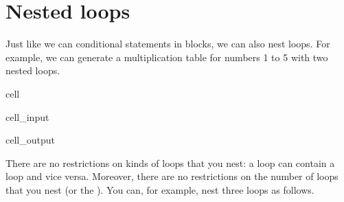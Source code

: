 \documentclass[letterpaper,10pt,english]{jupyterBook}
\begin{document}
\section{Nested loops}
\label{\detokenize{notebooks/03_ControlStructures/03_ControlStructures_student:nested-loops}}
\sphinxAtStartPar
Just like we can  conditional statements in blocks, we can also nest loops. For example, we can generate a multiplication table for numbers 1 to 5 with two nested loops.

\begin{sphinxuseclass}{cell}\begin{sphinxVerbatimInput}

\begin{sphinxuseclass}{cell_input}
\begin{sphinxVerbatim}[commandchars=\\\{\}]
    
      \PYG{p}{[}\PYG{p}{]}
        
\end{sphinxVerbatim}

\end{sphinxuseclass}\end{sphinxVerbatimInput}
\begin{sphinxVerbatimOutput}

\begin{sphinxuseclass}{cell_output}
\begin{sphinxVerbatim}[commandchars=\\\{\}]
[1, 2, 3, 4, 5]
[2, 4, 6, 8, 10]
[3, 6, 9, 12, 15]
[4, 8, 12, 16, 20]
[5, 10, 15, 20, 25]
\end{sphinxVerbatim}

\end{sphinxuseclass}\end{sphinxVerbatimOutput}

\end{sphinxuseclass}
\sphinxAtStartPar
There are no restrictions on kinds of loops that you nest: a  loop can contain a  loop and vice versa. Moreover, there are no restrictions on the number of loops that you nest (or the ). You can, for example, nest three loops as follows.
\end{document}

